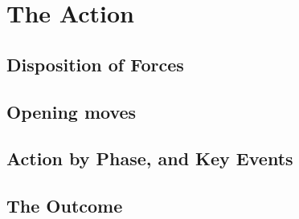 \section{The Action}

\subsection{Disposition of Forces}
\subsection{Opening moves}
\subsection{Action by Phase, and Key Events}
\subsection{The Outcome}
